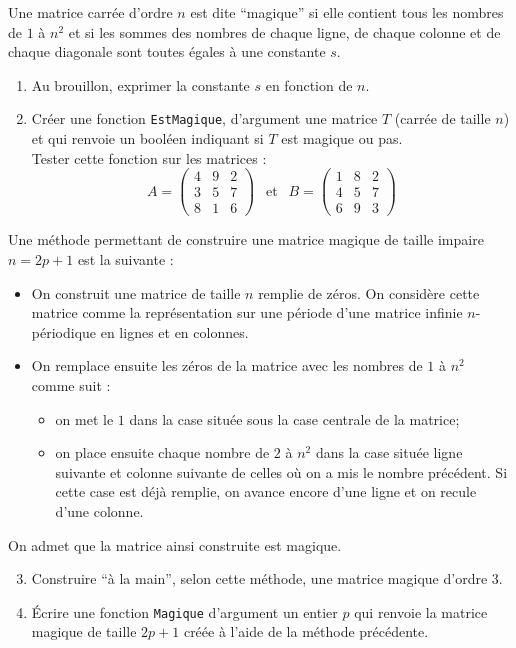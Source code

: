\begin{exercice}
Une matrice carrée d'ordre $n$ est dite ``magique'' si elle contient tous les nombres de $1$ à $n^2$ et si les sommes des nombres de chaque ligne, de chaque colonne  et de chaque diagonale sont toutes  égales à une constante $s$.
\begin{enumerate}
\item Au brouillon, exprimer la constante $s$ en fonction de $n$.
\item Créer une fonction \texttt{EstMagique}, d'argument une matrice $T$ (carrée de taille $n$) et qui renvoie un booléen indiquant si $T$ est magique ou pas. \\
Tester cette fonction sur les matrices :
$$ A=\left(\begin{array}{ccc}
4 & 9 & 2 \\ 3 & 5 & 7 \\ 8 & 1 & 6
\end{array}\right)~~\text{ et }~~B=\left(\begin{array}{ccc}
1 & 8 & 2 \\ 4 & 5 & 7 \\ 6 & 9 & 3
\end{array}\right)$$
\end{enumerate}
Une méthode permettant de construire une matrice magique de taille impaire $n=2p+1$ est la suivante :
\begin{itemize}
\item On construit une matrice de taille $n$ remplie de zéros. On considère cette matrice comme la représentation sur une période d'une matrice infinie $n$-périodique en lignes et en colonnes.
\item On remplace ensuite les zéros de la matrice avec les nombres de $1$ à $n^2$ comme  suit :
\begin{itemize}
\item on met le $1$ dans la case située sous la case centrale de la matrice;
\item on place ensuite chaque nombre de $2$ à $n^2$ dans la case située ligne suivante et colonne suivante de celles où on a mis le nombre précédent. Si cette case est déjà remplie, on avance encore d'une ligne et on recule d'une colonne.
\end{itemize}
\end{itemize}
On admet que la matrice ainsi construite est magique.
\begin{enumerate}
\setcounter{enumi}{2}
\item Construire ``à la main'', selon cette méthode, une matrice magique d'ordre $3$.
\item \'Ecrire une fonction \texttt{Magique} d'argument un entier $p$ qui renvoie la matrice magique de taille $2p+1$ créée à l'aide de la méthode précédente.
\end{enumerate}
\end{exercice}






